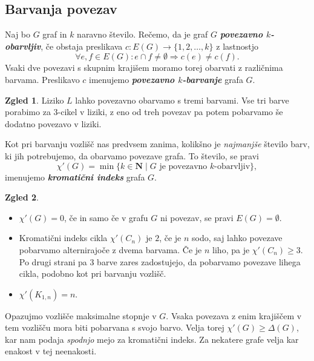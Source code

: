 \documentclass[11pt]{book}
\def\NN{\mathbf{N}}
\def\definicija{\color{rdeca}\bf\em}
\theoremstyle{definition}
\theoremstyle{zgled}
\newtheorem*{zgled}{Zgled}
\theoremstyle{odprtproblem}
\theoremstyle{domacanaloga}
\theoremstyle{izrek}
\begin{document}
\subsection{Barvanja povezav}

Naj bo $G$ graf in $k$ naravno število. Rečemo, da je graf $G$ {\definicija povezavno $k$-obarvljiv}, če obstaja preslikava $c \colon E(G) \to \{ 1,2, \dots, k\}$ z lastnostjo
\[
    \forall e,f \in E(G) \colon e \cap f \neq \emptyset \Rightarrow c(e) \neq c(f).
\]
Vsaki dve povezavi s skupnim krajišem moramo torej obarvati z različnima barvama. Preslikavo $c$ imenujemo {\definicija povezavno $k$-barvanje} grafa $G$.

\begin{zgled}
Liziko $L$ lahko povezavno obarvamo s tremi barvami. Vse tri barve porabimo za $3$-cikel v liziki, z eno od treh povezav pa potem pobarvamo še dodatno povezavo v liziki.
\end{zgled}

Kot pri barvanju vozlišč nas predvsem zanima, kolikšno je \emph{najmanjše} število barv, ki jih potrebujemo, da obarvamo povezave grafa. To število, se pravi
\[
\chi'(G) = \min \{ k \in \NN \mid \text{$G$ je povezavno $k$-obarvljiv} \},
\]
imenujemo {\definicija kromatični indeks} grafa $G$.

\begin{zgled} \leavevmode
\begin{itemize}
    \item $\chi'(G) = 0$, če in samo če v grafu $G$ ni povezav, se pravi $E(G) = \emptyset$.
    \item Kromatični indeks cikla $\chi'(C_n)$ je $2$, če je $n$ sodo, saj lahko povezave pobarvamo alternirajoče z dvema barvama. Če je $n$ liho, pa je $\chi'(C_n) \geq 3$. Po drugi strani pa $3$ barve zares zadostujejo, da pobarvamo povezave lihega cikla, podobno kot pri barvanju vozlišč.
    \item $\chi'(K_{1,n}) = n$.
\end{itemize}
\end{zgled}

Opazujmo vozlišče maksimalne stopnje v $G$. Vsaka povezava z enim krajiščem v tem vozlišču mora biti pobarvana s svojo barvo. Velja torej $\chi'(G) \geq \Delta(G)$, kar nam podaja \emph{spodnjo} mejo za kromatični indeks. Za nekatere grafe velja kar enakost v tej neenakosti.
\end{document}
